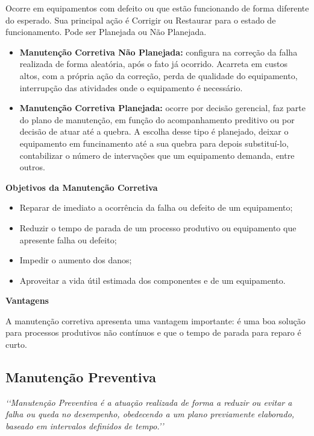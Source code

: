 		Ocorre em equipamentos com defeito ou que estão funcionando de forma diferente do esperado. Sua principal ação é Corrigir ou Restaurar para o estado de funcionamento. Pode ser Planejada ou Não Planejada.

		\begin{itemize}
			\item \textbf{Manutenção Corretiva Não Planejada:} configura na correção da falha realizada de forma aleatória, após o fato já ocorrido. Acarreta em custos altos, com a própria ação da correção, perda de qualidade do equipamento, interrupção das atividades onde o equipamento é necessário.
			\item \textbf{Manutenção Corretiva Planejada:} ocorre por decisão gerencial, faz parte do plano de manutenção, em função do acompanhamento preditivo ou por decisão de atuar até a quebra. A escolha desse tipo é planejado, deixar o equipamento em funcinamento até a sua quebra para depois substituí-lo, contabilizar o número de intervações que um equipamento demanda, entre outros.
		\end{itemize}

		\textbf{Objetivos da Manutenção Corretiva}
			\begin{itemize}
				\item Reparar de imediato a ocorrência da falha ou defeito de um equipamento;   
				\item Reduzir  o tempo de  parada de um processo produtivo ou equipamento que apresente falha ou defeito; 
				\item Impedir o aumento dos danos; 
				\item Aproveitar a vida útil estimada dos componentes e de um equipamento.
			\end{itemize}	

		\textbf{Vantagens}

		A manutenção corretiva apresenta uma vantagem importante: é uma boa solução para processos produtivos não contínuos e que o tempo de parada para reparo é curto. 


\subsection{Manutenção Preventiva}

		\emph{\lq\lq Manutenção Preventiva é a atuação realizada de forma a reduzir ou evitar a falha ou queda no desempenho, obedecendo a um plano previamente elaborado, baseado em intervalos definidos de tempo.\rq\rq} \cite{kardecnascif2010}

